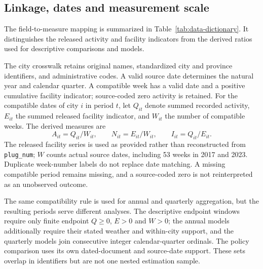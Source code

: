 \subsection{Linkage, dates and measurement scale}
The field-to-measure mapping is summarized in Table~\ref{tab:data-dictionary}.
It distinguishes the released activity and facility indicators from the
derived ratios used for descriptive comparisons and models.

The city crosswalk retains original names, standardized city and province
identifiers, and administrative codes.  A valid source date determines the
natural year and calendar quarter.  A compatible week has a valid date and a
positive cumulative facility indicator; source-coded zero activity is retained.
For the compatible dates of city $i$ in period $t$, let $Q_{it}$ denote summed
recorded activity, $E_{it}$ the summed released facility indicator, and
$W_{it}$ the number of compatible weeks.  The derived measures are
\begin{equation}
 A_{it}=Q_{it}/W_{it},\qquad N_{it}=E_{it}/W_{it},\qquad
 I_{it}=Q_{it}/E_{it}.
 \label{eq:si-source-measures}
\end{equation}
The released facility series is used as provided rather than reconstructed from
\texttt{plug\_num}; $W$ counts actual source dates, including 53 weeks in 2017
and 2023.  Duplicate week-number labels do not replace date matching.  A
missing compatible period remains missing, and a source-coded zero is not
reinterpreted as an unobserved outcome.

The same compatibility rule is used for annual and quarterly aggregation, but
the resulting periods serve different analyses.  The descriptive endpoint
windows require only finite endpoint $Q\geq0$, $E>0$ and $W>0$; the annual
models additionally require their stated weather and within-city support, and
the quarterly models join consecutive integer calendar-quarter ordinals.  The
policy comparison uses its own dated-document and source-date support.  These
sets overlap in identifiers but are not one nested estimation sample.

